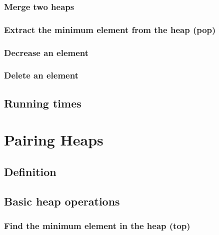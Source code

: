 \documentclass{article}
\begin{document}
\subsubsection{Merge two heaps}

\subsubsection{Extract the minimum element from the heap (pop)}

\subsubsection{Decrease an element}

\subsubsection{Delete an element}

\subsection{Running times}



\section{Pairing Heaps}
\label{pairing-heap}

\subsection{Definition}

\subsection{Basic heap operations}

\subsubsection{Find the minimum element in the heap (top)}
\end{document}
